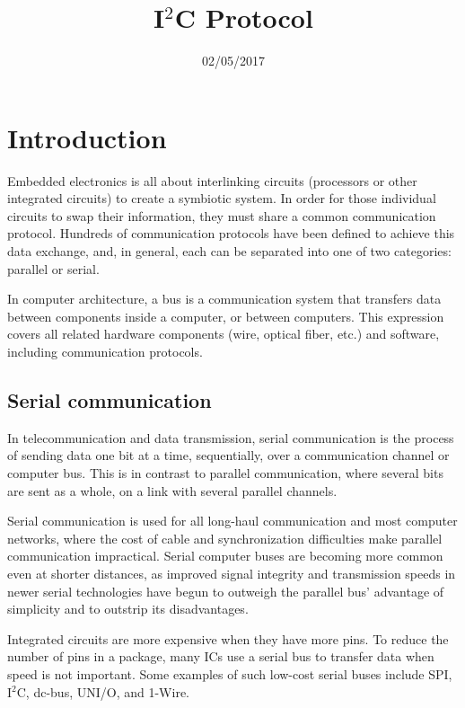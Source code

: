 \documentclass[12pt,twocolumn]{IEEEtran}
\title{I$^{2}$C Protocol}
\date{02/05/2017}
\begin{document}
  \maketitle
    \section{Introduction}
    
     Embedded electronics is all about interlinking circuits (processors or other integrated circuits) to create a symbiotic system. In order for those individual circuits to swap their information, they must share a common communication protocol. Hundreds of communication protocols have been defined to achieve this data exchange, and, in general, each can be separated into one of two categories: parallel or serial.

In computer architecture, a bus is a communication system that transfers data between components inside a computer, or between computers. This expression covers all related hardware components (wire, optical fiber, etc.) and software, including communication protocols.

   \subsection {Serial communication}

In telecommunication and data transmission, serial communication is the process of sending data one bit at a time, sequentially, over a communication channel or computer bus. This is in contrast to parallel communication, where several bits are sent as a whole, on a link with several parallel channels.

Serial communication is used for all long-haul communication and most computer networks, where the cost of cable and synchronization difficulties make parallel communication impractical. Serial computer buses are becoming more common even at shorter distances, as improved signal integrity and transmission speeds in newer serial technologies have begun to outweigh the parallel bus' advantage of simplicity and to outstrip its disadvantages.

Integrated circuits are more expensive when they have more pins. To reduce the number of pins in a package, many ICs use a serial bus to transfer data when speed is not important. Some examples of such low-cost serial buses include SPI, I$^{2}$C, dc-bus, UNI/O, and 1-Wire.

  
\end{document}

